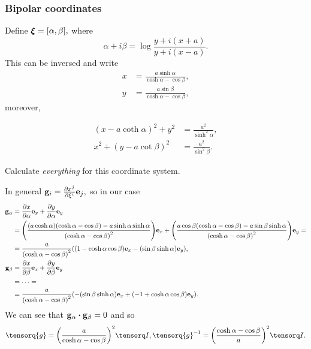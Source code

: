 \documentclass[reqno, a4paper]{article}
\begin{document}
\subsubsection{Bipolar coordinates}
\label{sec:bipolar_coordinates}

Define $\vb*{\xi} = [\alpha,\beta],$ where
\[
	\alpha+i \beta = \log \frac{y+i(x+a)}{y+i(x-a)}.
\]
This can be inversed and write
\begin{align*}
	x&=\frac{a \sinh \alpha}{\cosh \alpha - \cos \beta},\\
	y&= \frac{a \sin \beta}{\cosh \alpha -\cos \beta},
\end{align*}
moreover,

\begin{align*}
	(x-a \coth \alpha)^{2}+y^{2} &= \frac{a^{2}}{\sinh^{2}\alpha}, \\
	x^{2}+(y-a \cot \beta)^{2} &= \frac{a^2}{\sin^{2}\beta}.
\end{align*}

Calculate \textit{everything} for this coordinate system.

In general $\vb{g}_i=\pdv{x^j}{\xi^i}\vb{e}_j,$ so in our case
\begin{align*}
	\vb{g}_{\alpha}&=\pdv{x}{\alpha}\vb{e}_x+\pdv{y}{\alpha}\vb{e}_y\\
		       &=\qty(\frac{(a \cosh \alpha)(\cosh \alpha-\cos \beta)-a \sinh \alpha\sinh \alpha}{\qty(\cosh \alpha - \cos \beta)^{2}})\vb{e}_x+\qty(\frac{a \cos \beta(\cosh \alpha-\cos \beta)-a \sin \beta \sinh \alpha}{\qty(\cosh \alpha - \cos \beta)^{2}})\vb{e}_y = \\
		       & = \frac{a}{\qty(\cosh \alpha - \cos \beta)^{2}}\qty((1-\cosh \alpha \cos \beta)\vb{e}_x-(\sin \beta \sinh \alpha) \vb{e}_y),\\
	\vb{g}_{\beta}& = \pdv{x}{\beta}\vb{e}_x+\pdv{y}{\beta}\vb{e}_y\\
		      &= \dots =\\
		      &= \frac{a}{\qty(\cosh \alpha-\cos \beta)^{2}}\qty(-\qty(\sin \beta \sinh \alpha)\vb{e}_x + \qty(-1+\cosh \alpha \cos \beta)\vb{e}_y).
\end{align*}
We can see that $\vb{g}_{\alpha} \vdot \vb{g}_{\beta}=0$ and so
\[
	\tensorq{g}=\qty(\frac{a}{\cosh \alpha - \cos \beta})^{2}\identity, \inverse{\tensorq{g}} = \qty(\frac{\cosh \alpha-\cos \beta}{a})^{2} \identity.
\]
\end{document}
